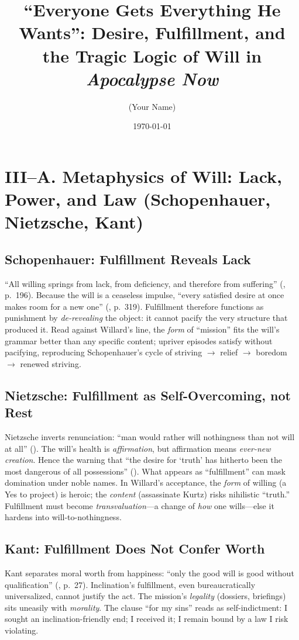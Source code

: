 \documentclass[12pt]{article}
\title{“Everyone Gets Everything He Wants”: Desire, Fulfillment, and the Tragic Logic of Will in \textit{Apocalypse Now}}
\author{(Your Name)}
\date{\today}
\begin{document}
\maketitle

\section*{III–A. Metaphysics of Will: Lack, Power, and Law (Schopenhauer, Nietzsche, Kant)}

\subsection*{Schopenhauer: Fulfillment Reveals Lack}
“All willing springs from lack, from deficiency, and therefore from suffering” (\parencite{SchopenhauerWWR1969}, p.~196). Because the will is a ceaseless impulse, “every satisfied desire at once makes room for a new one” (\parencite{SchopenhauerWWR1969}, p.~319). Fulfillment therefore functions as punishment by \emph{de-revealing} the object: it cannot pacify the very structure that produced it. Read against Willard’s line, the \emph{form} of “mission” fits the will’s grammar better than any specific content; upriver episodes satisfy without pacifying, reproducing Schopenhauer’s cycle of striving $\rightarrow$ relief $\rightarrow$ boredom $\rightarrow$ renewed striving.

\subsection*{Nietzsche: Fulfillment as Self-Overcoming, not Rest}
Nietzsche inverts renunciation: “man would rather will nothingness than not will at all” (\parencite[III.28, p.~162]{NietzscheGenealogy1994}). The will’s health is \emph{affirmation}, but affirmation means \emph{ever-new creation}. Hence the warning that “the desire for ‘truth’ has hitherto been the most dangerous of all possessions” (\parencite[\S 34]{NietzscheBGE1990}). What appears as “fulfillment” can mask domination under noble names. In Willard’s acceptance, the \emph{form} of willing (a Yes to project) is heroic; the \emph{content} (assassinate Kurtz) risks nihilistic “truth.” Fulfillment must become \emph{transvaluation}—a change of \emph{how} one wills—else it hardens into will-to-nothingness.

\subsection*{Kant: Fulfillment Does Not Confer Worth}
Kant separates moral worth from happiness: “only the good will is good without qualification” (\parencite{KantCPrR1996}, p.~27). Inclination’s fulfillment, even bureaucratically universalized, cannot justify the act. The mission’s \emph{legality} (dossiers, briefings) sits uneasily with \emph{morality}. The clause “for my sins” reads as self-indictment: I sought an inclination-friendly end; I received it; I remain bound by a law I risk violating.
\end{document}
